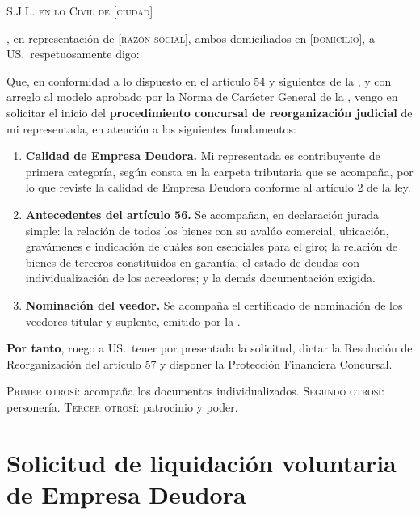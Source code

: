\begin{escrito}
\small
\noindent\textsc{S.J.L. en lo Civil de} [\textsc{ciudad}]

\medskip
{}, en representación de
[\textsc{razón social}], ambos domiciliados en [\textsc{domicilio}], a US.\
respetuosamente digo:

\medskip
Que, en conformidad a lo dispuesto en el artículo 54 y siguientes de la \LIR{}, y con
arreglo al modelo aprobado por la Norma de Carácter General \Nro 4 de la \superir{}, vengo
en solicitar el inicio del \textbf{procedimiento concursal de reorganización judicial} de
mi representada, en atención a los siguientes fundamentos:

\begin{enumerate}[leftmargin=1.6em]
  \item \textbf{Calidad de Empresa Deudora.} Mi representada es contribuyente de primera
  categoría, según consta en la carpeta tributaria que se acompaña, por lo que reviste la
  calidad de Empresa Deudora conforme al artículo 2 \Nro 13 de la ley.

  \item \textbf{Antecedentes del artículo 56.} Se acompañan, en declaración jurada simple:
  la relación de todos los bienes con su avalúo comercial, ubicación, gravámenes e
  indicación de cuáles son esenciales para el giro; la relación de bienes de terceros
  constituidos en garantía; el estado de deudas con individualización de los acreedores; y
  la demás documentación exigida.

  \item \textbf{Nominación del veedor.} Se acompaña el certificado de nominación de los
  veedores titular y suplente, emitido por la \superir{}.
\end{enumerate}

\medskip
\noindent\textbf{Por tanto}, ruego a US.\ tener por presentada la solicitud, dictar la
Resolución de Reorganización del artículo 57 y disponer la Protección Financiera Concursal.

\medskip
\noindent\textsc{Primer otrosí:} acompaña los documentos individualizados.
\textsc{Segundo otrosí:} personería. \textsc{Tercer otrosí:} patrocinio y poder.
\end{escrito}

\section{Solicitud de liquidación voluntaria de Empresa Deudora}

